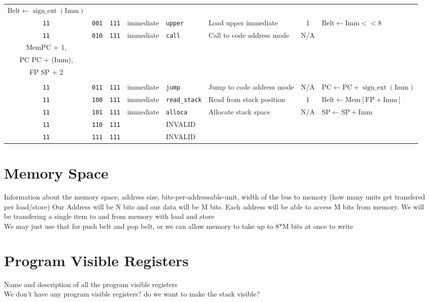 \documentclass{article}
\begin{document}
\begin{landscape}
\begin{longtable}{c c c c l l c l}
			\(\textrm{Belt} \gets \operatorname{sign\_ext}\left(\textrm{Imm}\right)\) \\
		\texttt{11} & \texttt{001} & \texttt{111} & immediate & \texttt{upper}       & Load upper immediate      & 1   &
			\(\textrm{Belt} \gets \textrm{Imm} << 8\) \\
		\texttt{11} & \texttt{010} & \texttt{111} & immediate & \texttt{call}        & Call to code address mode & N/A &
			\(\begin{array}{l}
				\textrm{Mem}\left[\textrm{SP}\right] \gets \textrm{FP}, \\
				\textrm{Mem}\left[\textrm{SP} + 1\right] \gets \textrm{PC} + 1, \\
				\textrm{PC} \gets \textrm{PC} + \operatorname{sign\_ext}\left(\textrm{Imm}\right), \\
				\textrm{FP} \gets \textrm{SP} + 2 \\
			\end{array}\) \\
		\texttt{11} & \texttt{011} & \texttt{111} & immediate & \texttt{jump}        & Jump to code address mode & N/A &
			\(\textrm{PC} \gets \textrm{PC} + \operatorname{sign\_ext}\left(\textrm{Imm}\right)\) \\
		\texttt{11} & \texttt{100} & \texttt{111} & immediate & \texttt{read\_stack} & Read from stack position  & 1   &
			\(\textrm{Belt} \gets \textrm{Mem}\left[\textrm{FP} + \textrm{Imm}\right]\) \\
		\texttt{11} & \texttt{101} & \texttt{111} & immediate & \texttt{alloca}      & Allocate stack space      & N/A &
			\(\textrm{SP} \gets \textrm{SP} + \textrm{Imm}\) \\
		\texttt{11} & \texttt{110} & \texttt{111} & & INVALID & \\
		\texttt{11} & \texttt{111} & \texttt{111} & & INVALID & \\
	\end{longtable}
\end{landscape}

\section{Memory Space}
	Information about the memory space, address size, bits-per-addressable-unit, width of the bus to memory (how many units get transfered per load/store)
	Our Address will be N bits and our data will be M bits.
	Each address will be able to access M bits from memory.
	We will be transfering a single item to and from memory with load and store\\
	We may just use that for push belt and pop belt, or we can allow memory to take up to 8*M bits at once to write

\section{Program Visible Registers}
	Name and description of all the program visible registers\\
	We don't have any program visible registers? do we want to make the stack visible?
\end{document}

